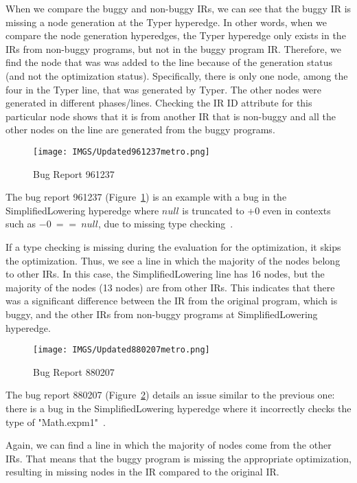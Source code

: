 \documentclass[runningheads]{llncs}
\begin{document}
\begin{appendices}
When we compare the buggy and non-buggy IRs, we can see that the buggy IR is missing a node generation at the Typer hyperedge. 
In other words, when we compare the node generation hyperedges, the Typer hyperedge only exists in the IRs from non-buggy programs, but not in the buggy program IR.
Therefore, we find the node that was was added to the line because of the generation status (and not the optimization status). Specifically, there is only one node, among the four in the Typer line, that was generated by Typer. The other nodes were generated in different phases/lines. Checking the IR ID attribute for this particular node shows that it is from another IR that is non-buggy and all the other nodes on the line are generated from the buggy programs.
%
%

\begin{figure}[h]
    \texttt{[image: IMGS/Updated961237metro.png]}
    \caption{Bug Report 961237}
    \label{fig:961237}
\end{figure}

The bug report 961237 (Figure~\ref{fig:961237}) is an example with a bug in the SimplifiedLowering hyperedge where $null$ is truncated to +0 even in contexts such as $-0\ ==\ null$, due to missing type checking~\cite{DBLP:conf/vee/LimD21,issue961237}.

If a type checking is missing during the evaluation for the optimization, it skips the optimization. Thus, we see a line in which the majority of the nodes belong to other IRs. In this case, the SimplifiedLowering line has 16 nodes, but the majority of the nodes (13 nodes) are from other IRs. This indicates that there was a significant difference between the IR from the original program, which is buggy, and the other IRs from non-buggy programs at SimplifiedLowering hyperedge.
%
%

\begin{figure}[h]
    \texttt{[image: IMGS/Updated880207metro.png]}
    \caption{Bug Report 880207}
    \label{fig:880207}
\end{figure}

The bug report 880207 (Figure~\ref{fig:880207}) details an issue similar to the previous one: there is a bug in the SimplifiedLowering hyperedge where it incorrectly checks the type of "Math.expm1"~\cite{issue880207}.

Again, we can find a line in which the majority of nodes come from the other IRs. That means that the buggy program is missing  the appropriate optimization, resulting in missing nodes in the IR compared to the original IR.


\end{appendices}
\end{document}
